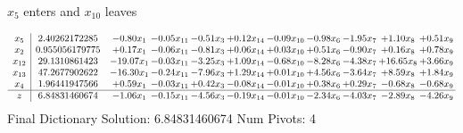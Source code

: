 \documentclass[9pt]{article}
\begin{document}
 $ x_{5} $ enters and $ x_{10} $ leaves 

 \[\begin{array}{c| c c@{\hskip 2pt} c@{\hskip 2pt} c@{\hskip 2pt} c@{\hskip 2pt} c@{\hskip 2pt} c@{\hskip 2pt} c@{\hskip 2pt} c@{\hskip 2pt} c@{\hskip 2pt} }
 x_{5}   &  2.40262172285 & -0.80 x_{1} & -0.05 x_{11} & -0.51 x_{3} & +  0.12 x_{14} & -0.09 x_{10} & -0.98 x_{6} & -1.95 x_{7} & +  1.10 x_{8} & +  0.51 x_{9}\\
 x_{2}   &  0.955056179775 & +  0.17 x_{1} & -0.06 x_{11} & -0.81 x_{3} & +  0.06 x_{14} & +  0.03 x_{10} & +  0.51 x_{6} & -0.90 x_{7} & +  0.16 x_{8} & +  0.78 x_{9}\\
 x_{12}   &  29.1310861423 & -19.07 x_{1} & -0.03 x_{11} & -3.25 x_{3} & +  1.09 x_{14} & -0.68 x_{10} & -8.28 x_{6} & -4.38 x_{7} & + 16.65 x_{8} & +  3.66 x_{9}\\
 x_{13}   &  47.2677902622 & -16.30 x_{1} & -0.24 x_{11} & -7.96 x_{3} & +  1.29 x_{14} & +  0.01 x_{10} & +  4.56 x_{6} & -3.64 x_{7} & +  8.59 x_{8} & +  1.84 x_{9}\\
 x_{4}   &  1.96441947566 & +  0.59 x_{1} & -0.03 x_{11} & +  0.42 x_{3} & -0.08 x_{14} & -0.01 x_{10} & +  0.38 x_{6} & +  0.29 x_{7} & -0.68 x_{8} & -0.68 x_{9}\\
\hline
z    &  6.84831460674 & -1.06 x_{1} & -0.15 x_{11} & -4.56 x_{3} & -0.19 x_{14} & -0.01 x_{10} & -2.34 x_{6} & -4.03 x_{7} & -2.89 x_{8} & -4.26 x_{9}\\
\end{array}\]
Final Dictionary
Solution:  6.84831460674
Num Pivots:  4
\end{document}
